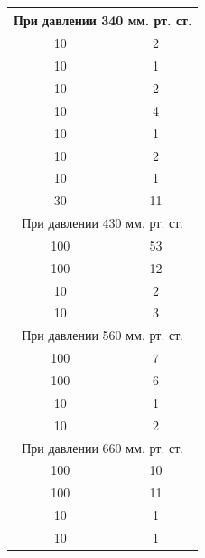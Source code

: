\documentclass[a4paper,14pt]{extarticle}
\begin{document}
\begin{table}[h!]
\begin{tabular}{|c|c|}
			\multicolumn{2}{|c|}{При давлении 340 мм. рт. ст.}\\ \hline
			10	&	2	\\ \hline
			10	&	1	\\ \hline
			10	&	2	\\ \hline
			10	&	4	\\ \hline
			10	&	1	\\ \hline
			10	&	2	\\ \hline
			10	&	1	\\ \hline
			30	&	11	\\ \hline	
			\multicolumn{2}{|c|}{При давлении 430 мм. рт. ст.}\\ \hline
			100	&	53	\\ \hline
			100	&	12	\\ \hline
			10	&	2	\\ \hline
			10	&	3	\\ \hline
			\multicolumn{2}{|c|}{При давлении 560 мм. рт. ст.}\\ \hline
			100	&	7	\\ \hline
			100	&	6	\\ \hline
			10	&	1	\\ \hline
			10	&	2	\\ \hline
			\multicolumn{2}{|c|}{При давлении 660 мм. рт. ст.}\\ \hline
			100	&	10	\\ \hline
			100	&	11	\\ \hline
			10	&	1	\\ \hline
			10	&	1	\\ \hline
		
		\end{tabular}
	\end{table}
	\clearpage
	
\end{document}

